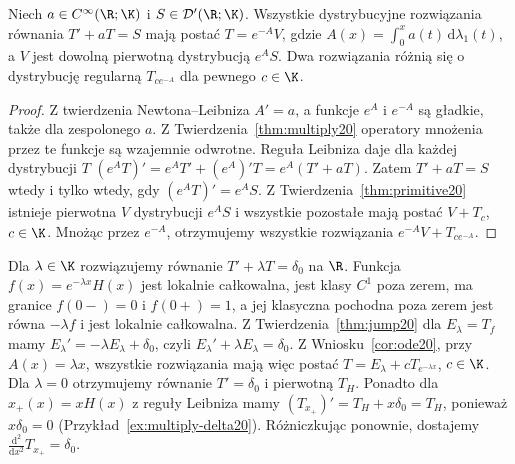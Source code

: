 \begin{wniosek}
\label{cor:ode20}
Niech $a\in C^\infty(\R;\K)$ i
$S\in\mathcal D'(\R;\K)$. Wszystkie dystrybucyjne
rozwiązania równania $T'+aT=S$ mają postać
$T=e^{-A}V$, gdzie $A(x)=\int_0^xa(t)\,\mathrm d\lambda_1(t)$,
a $V$ jest dowolną pierwotną dystrybucją $e^AS$.
Dwa rozwiązania różnią się o dystrybucję regularną
$T_{c e^{-A}}$ dla pewnego $c\in\K$.
\end{wniosek}
\begin{proof}
Z twierdzenia Newtona--Leibniza $A'=a$, a funkcje $e^A$
i $e^{-A}$ są gładkie, także dla zespolonego $a$.
Z Twierdzenia~\ref{thm:multiply20} operatory mnożenia
przez te funkcje są wzajemnie odwrotne.
Reguła Leibniza daje dla każdej dystrybucji $T$
$(e^AT)'=e^AT'+(e^A)'T=e^A(T'+aT)$.
Zatem $T'+aT=S$ wtedy i tylko wtedy, gdy
$(e^AT)'=e^AS$. Z Twierdzenia~\ref{thm:primitive20}
istnieje pierwotna $V$ dystrybucji $e^AS$ i wszystkie
pozostałe mają postać $V+T_c$, $c\in\K$.
Mnożąc przez $e^{-A}$, otrzymujemy wszystkie rozwiązania
$e^{-A}V+T_{ce^{-A}}$.
\end{proof}

\begin{przyklad}
\label{ex:forced-ode20}
Dla $\lambda\in\K$ rozwiązujemy równanie
$T'+\lambda T=\delta_0$ na $\R$.
Funkcja $f(x)=e^{-\lambda x}H(x)$ jest lokalnie całkowalna,
jest klasy $C^1$ poza zerem, ma granice $f(0-)=0$ i
$f(0+)=1$, a jej klasyczna pochodna poza zerem jest równa
$-\lambda f$ i jest lokalnie całkowalna.
Z Twierdzenia~\ref{thm:jump20} dla $E_\lambda=T_f$ mamy
$E_\lambda'=-\lambda E_\lambda+\delta_0$, czyli
$E_\lambda'+\lambda E_\lambda=\delta_0$.
Z Wniosku~\ref{cor:ode20}, przy $A(x)=\lambda x$,
wszystkie rozwiązania mają więc postać
$T=E_\lambda+cT_{e^{-\lambda x}}$, $c\in\K$.
Dla $\lambda=0$ otrzymujemy równanie $T'=\delta_0$
i pierwotną $T_H$.
Ponadto dla $x_+(x)=xH(x)$ z reguły Leibniza mamy
$(T_{x_+})'=T_H+x\delta_0=T_H$, ponieważ
$x\delta_0=0$ (Przykład~\ref{ex:multiply-delta20}).
Różniczkując ponownie, dostajemy
$\frac{\mathrm d^2}{\mathrm dx^2}T_{x_+}=\delta_0$.
\end{przyklad}

